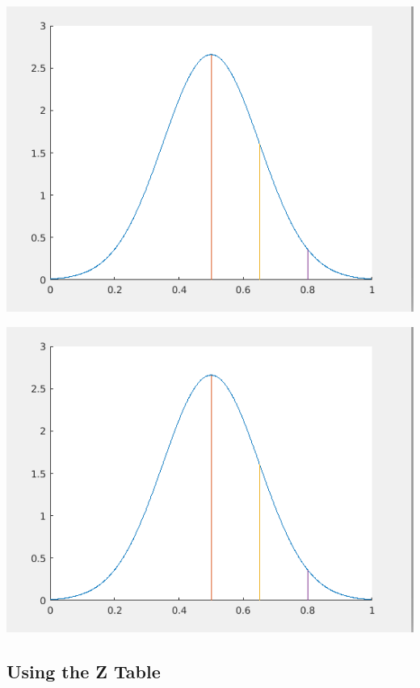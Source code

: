 \documentclass[fleqn]{beamer} %
\newcommand{\sectionIIsubsectionIIItitle}{Using the Z Table}
\begin{document}
			\begin{frame}
				\includegraphics[scale=.50]{images/lecture1_fig1.png}
			\end{frame}

			\begin{frame}
				\includegraphics[scale=.50]{images/lecture1_fig1.png}
			\end{frame}

		\subsection{\sectionIIsubsectionIIItitle}\label{sectionIIsubsectionIII}
\end{document}
